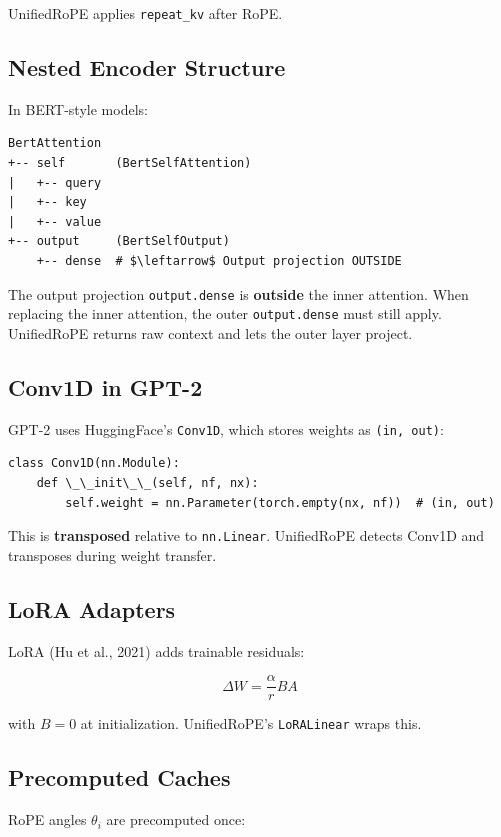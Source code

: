 UnifiedRoPE applies \texttt{repeat\_kv} after RoPE.

\subsection{Nested Encoder Structure}

In BERT-style models:

\begin{lstlisting}
BertAttention
+-- self       (BertSelfAttention)
|   +-- query
|   +-- key
|   +-- value
+-- output     (BertSelfOutput)
    +-- dense  # $\leftarrow$ Output projection OUTSIDE
\end{lstlisting}

The output projection \texttt{output.dense} is \textbf{outside} the inner attention. 
When replacing the inner attention, the outer \texttt{output.dense} must still 
apply. UnifiedRoPE returns raw context and lets the outer layer project.

\subsection{Conv1D in GPT-2}

GPT-2 uses HuggingFace's \texttt{Conv1D}, which stores weights as \texttt{(in, out)}:

\begin{lstlisting}
class Conv1D(nn.Module):
    def \_\_init\_\_(self, nf, nx):
        self.weight = nn.Parameter(torch.empty(nx, nf))  # (in, out)
\end{lstlisting}

This is \textbf{transposed} relative to \texttt{nn.Linear}. UnifiedRoPE detects Conv1D 
and transposes during weight transfer.

\subsection{LoRA Adapters}

LoRA (Hu et al., 2021) adds trainable residuals:

\[
\Delta W = \frac{\alpha}{r} B A
\tag{3.8}
\]

with $B = 0$ at initialization. UnifiedRoPE's \texttt{LoRALinear} wraps this.

\subsection{Precomputed Caches}

RoPE angles $\theta_i$ are precomputed once:

